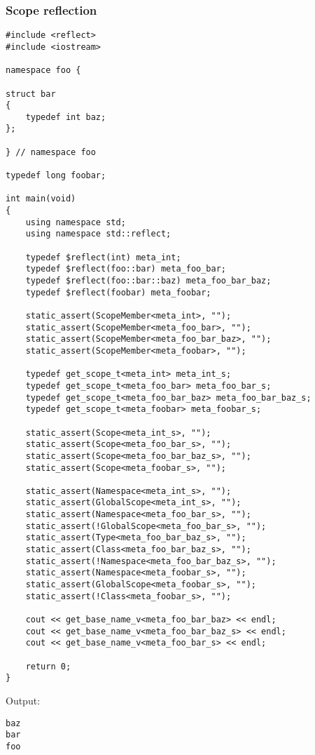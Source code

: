 \subsubsection{Scope reflection}

\begin{verbatim}
#include <reflect>
#include <iostream>

namespace foo {

struct bar
{
	typedef int baz;
};

} // namespace foo

typedef long foobar;

int main(void)
{
	using namespace std;
	using namespace std::reflect;

	typedef $reflect(int) meta_int;
	typedef $reflect(foo::bar) meta_foo_bar;
	typedef $reflect(foo::bar::baz) meta_foo_bar_baz;
	typedef $reflect(foobar) meta_foobar;

	static_assert(ScopeMember<meta_int>, "");
	static_assert(ScopeMember<meta_foo_bar>, "");
	static_assert(ScopeMember<meta_foo_bar_baz>, "");
	static_assert(ScopeMember<meta_foobar>, "");

	typedef get_scope_t<meta_int> meta_int_s;
	typedef get_scope_t<meta_foo_bar> meta_foo_bar_s;
	typedef get_scope_t<meta_foo_bar_baz> meta_foo_bar_baz_s;
	typedef get_scope_t<meta_foobar> meta_foobar_s;

	static_assert(Scope<meta_int_s>, "");
	static_assert(Scope<meta_foo_bar_s>, "");
	static_assert(Scope<meta_foo_bar_baz_s>, "");
	static_assert(Scope<meta_foobar_s>, "");

	static_assert(Namespace<meta_int_s>, "");
	static_assert(GlobalScope<meta_int_s>, "");
	static_assert(Namespace<meta_foo_bar_s>, "");
	static_assert(!GlobalScope<meta_foo_bar_s>, "");
	static_assert(Type<meta_foo_bar_baz_s>, "");
	static_assert(Class<meta_foo_bar_baz_s>, "");
	static_assert(!Namespace<meta_foo_bar_baz_s>, "");
	static_assert(Namespace<meta_foobar_s>, "");
	static_assert(GlobalScope<meta_foobar_s>, "");
	static_assert(!Class<meta_foobar_s>, "");

	cout << get_base_name_v<meta_foo_bar_baz> << endl;
	cout << get_base_name_v<meta_foo_bar_baz_s> << endl;
	cout << get_base_name_v<meta_foo_bar_s> << endl;

	return 0;
}
\end{verbatim}

Output:

\begin{verbatim}
baz
bar
foo
\end{verbatim}

